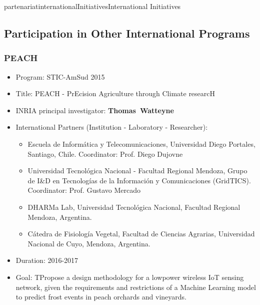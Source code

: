 \documentclass{ra2016}
\newcommand{\thomas}  {\textbf{Thomas~Watteyne}}
\begin{document}
\begin{module}{partenariat}{internationalInitiatives}{International Initiatives}

\subsection{Participation in Other International Programs}


\subsubsection{PEACH}

\begin{itemize}
    \item Program: STIC-AmSud 2015
    \item Title: PEACH - PrEcision Agriculture through Climate researcH
    \item INRIA principal investigator: \thomas
    \item International Partners (Institution -  Laboratory - Researcher):
        \begin{itemize}
            \item Escuela de Inform\'atica y Telecomunicaciones, Universidad Diego Portales, Santiago, Chile. Coordinator: Prof. Diego Dujovne
            \item Universidad Tecnol\'ogica Nacional - Facultad Regional Mendoza, Grupo de I\&D en Tecnologías de la Información y Comunicaciones (GridTICS). Coordinator: Prof. Gustavo Mercado
            \item DHARMa Lab, Universidad Tecnol\'ogica Nacional, Facultad Regional Mendoza, Argentina.
            \item C\'atedra de Fisiolog\'ia Vegetal, Facultad de Ciencias Agrarias, Universidad Nacional de Cuyo, Mendoza, Argentina.
        \end{itemize}
    \item Duration: 2016-2017
    \item Goal: TPropose a design methodology for a low­power wireless IoT sensing network, given the requirements and restrictions of a Machine Learning model to predict frost events in peach orchards and vineyards.
\end{itemize}


\end{module}
\end{document}
